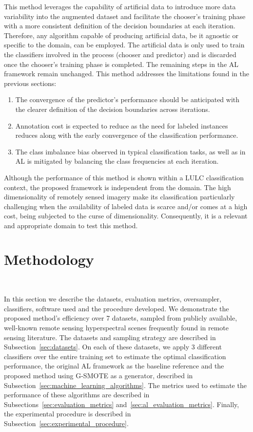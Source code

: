 \documentclass[preprint,12pt]{elsarticle}
\begin{document}
This method leverages the capability of artificial data to introduce more data
variability into the augmented dataset and facilitate the chooser's training
phase with a more consistent definition of the decision boundaries at each
iteration. Therefore, any algorithm capable of producing artificial data, be
it agnostic or specific to the domain, can be employed. The artificial data is
only used to train the classifiers involved in the process (chooser and
predictor) and is discarded once the chooser's training phase is completed.
The remaining steps in the AL framework remain unchanged. This method
addresses the limitations found in the previous sections: 

\begin{enumerate}
    \item The convergence of the predictor's performance should be anticipated
        with the clearer definition of the decision boundaries across
        iterations.
    \item Annotation cost is expected to reduce as the need for labeled
        instances reduces along with the early convergence of the
        classification performance.
    \item The class imbalance bias observed in typical classification tasks, as
        well as in AL is mitigated by balancing the class frequencies at each
        iteration.
\end{enumerate}

Although the performance of this method is shown within a LULC classification
context, the proposed framework is independent from the domain. The high
dimensionality of remotely sensed imagery make its classification particularly
challenging when the availability of labeled data is scarce and/or comes at a
high cost, being subjected to the curse of dimensionality. Consequently, it is
a relevant and appropriate domain to test this method.

\section{Methodology}~\label{sec:methodology}

In this section we describe the datasets, evaluation metrics, oversampler,
classifiers, software used and the procedure developed. We demonstrate the
proposed method's efficiency over 7 datasets, sampled from publicly available,
well-known remote sensing hyperspectral scenes frequently found in remote
sensing literature. The datasets and sampling strategy are described in
Subsection~\ref{sec:datasets}. On each of these datasets, we apply 3 different
classifiers over the entire training set to estimate the optimal
classification performance, the original AL framework as the baseline
reference and the proposed method using G-SMOTE as a generator, described in
Subsection~\ref{sec:machine_learning_algorithms}. The metrics used to estimate
the performance of these algorithms are described in
Subsections~\ref{sec:evaluation_metrics} and~\ref{sec:al_evaluation_metrics}.
Finally, the experimental procedure is described in
Subsection~\ref{sec:experimental_procedure}. 
\end{document}
